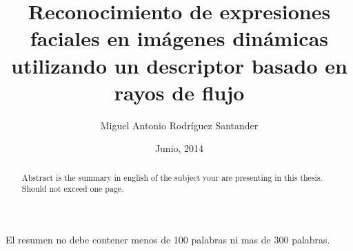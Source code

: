\documentclass[final]{udpthesis}
\begin{document}
\frontmatter
\title{Reconocimiento de expresiones faciales en imágenes dinámicas utilizando un descriptor basado en rayos de flujo}

\author{Miguel Antonio Rodríguez Santander}

\date{Junio, 2014}




\makecover

\tableofcontents%
\listoffigures%

\begin{abstract}
Abstract is the summary in english of the subject your are presenting in this thesis. Should not exceed one page.
\end{abstract}

\begin{resumen}
El resumen no debe contener menos de 100 palabras ni mas de 300 palabras.
\end{resumen}



\mainmatter










%
% 
\end{document}
